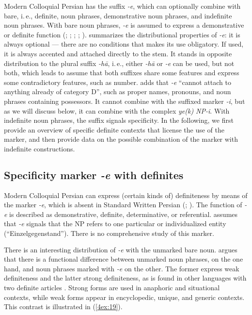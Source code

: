 \documentclass[output=paper]{langsci/langscibook}
\begin{document}
Modern Colloquial Persian has the suffix {\emph{-e}}, which can optionally combine with bare, i.\,e., definite, noun phrases, demonstrative noun phrases, and indefinite noun phrases. With bare noun phrases, {\emph{-e}} is assumed to express a demonstrative or definite function (\citealt[][40]{windfuhr:79}; \citealt[][163]{lazard:57}; \citealt[][67]{ghomeshi:03}; \citealt{toosarvandani:nasser:17}; \citealt{jasbi:20}). \cite[][173-177]{hincha:61} summarizes the distributional properties of {\emph{-e}}: it is always optional --- there are no conditions that makes its use obligatory. If used, it is always accented and attached directly to the stem. It stands in opposite distribution to the plural suffix {\emph{-hā}}, i.\,e., either {\emph{-hā}} or {\emph{-e}} can be used, but not both, which leads \cite[][175]{hincha:61} to assume that both suffixes share some features and express some contradictory features, such as number. \cite[][68]{ghomeshi:03} adds that {\emph{-e}} ``cannot attach to anything already of category D'', such as proper names, pronouns, and noun phrases containing possessors. It cannot combine with the suffixed marker {\emph{-i}}, but as we will discuss below, it can combine with the complex {\emph{ye(k) NP-i}}. With indefinite noun phrases, the suffix signals specificity. In the following, we first provide an overview of specific definite contexts that license the use of the marker, and then provide data on the possible combination of the marker with indefinite constructions. 


\subsection{Specificity marker {\emph{-e}} with definites}\label{4sec:41}

Modern Colloquial Persian can express (certain kinds of) definiteness by means of the marker {\emph{-e}}, which is absent in Standard Written Persian (\citealt[][50]{windfuhr:79}; \citealt{ghomeshi:03}). The function of {\emph{-e}} is described as demonstrative, definite, determinative, or referential. \cite[][176]{hincha:61} assumes that {\emph{-e}} signals that the NP refers to one particular or individualized entity (``Einzelgegenstand''). There is no comprehensive study of this marker.

\newpage
There is an interesting distribution of {\emph{-e}} with the unmarked bare noun. \cite{nikravan:14} argues that there is a functional difference between unmarked noun phrases, on the one hand, and noun phrases marked with {\emph{-e}} on the other. The former express weak definiteness and the latter strong definiteness, as is found in other languages with two definite articles \citep[see][]{schwarz:13}. Strong forms are used in anaphoric and situational contexts, while weak forms appear in encyclopedic, unique, and generic contexts. This contrast is illustrated in (\ref{4ex:19}).
\end{document}
